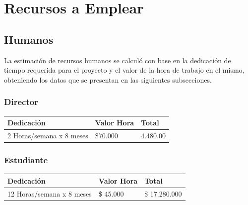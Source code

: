 


\section{Recursos a Emplear}
\subsection{Humanos}
La estimaci\'on de recursos humanos se calcul\'o con base en la dedicaci\'on de tiempo requerida para el proyecto y el valor de la hora de trabajo en el mismo, obteniendo los datos que se presentan en las siguientes subsecciones.

\subsubsection{Director}

\begin{table}[ht]
\centering
\begin{tabular}{|l|l|l|}
\hline
\textbf{Dedicaci\'on}      & \textbf{Valor Hora} & \textbf{Total} \\ \hline
2 Horas/semana x 8 meses & \$70.000            & 4.480.00       \\ \hline
\end{tabular}
\end{table}

\subsubsection{Estudiante}

\begin{table}[ht]
\centering
\begin{tabular}{|l|l|l|}
\hline
\textbf{Dedicaci\'on}       & \textbf{Valor Hora} & \textbf{Total} \\ \hline
12 Horas/semana x 8 meses & \$ 45.000           & \$ 17.280.000  \\ \hline
\end{tabular}
\end{table}


